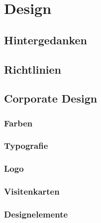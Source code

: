 \chapter{Design}
\section{Hintergedanken}
\section{Richtlinien}
\section{Corporate Design}
\subsection{Farben}
\subsection{Typografie}
\subsection{Logo}
\subsection{Visitenkarten}
\subsection{Designelemente}